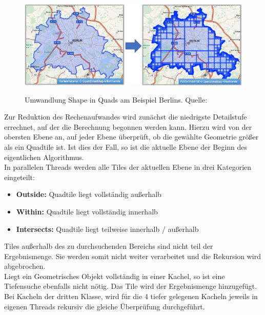 \documentclass[10pt,conference,compsocconf]{IEEEtran}
\begin{document}
\begin{figure}[H]
	\centering
	\includegraphics[width=1\columnwidth]{img/shape2quads.png} \\
	\caption[]{Umwandlung Shape in Quads am Beispiel Berlins. Quelle: \cite{JanBusch}}
	\label{img:shape2quads}
\end{figure}

Zur Reduktion des Rechenaufwandes wird zunächst die niedrigste Detailstufe errechnet, auf der die Berechnung begonnen werden kann. Hierzu wird von der obersten Ebene an, auf jeder Ebene überprüft, ob die gewählte Geometrie größer als ein Quadtile ist. Ist dies der Fall, so ist die aktuelle Ebene der Beginn des eigentlichen Algorithmus.\\
In parallelen Threads werden alle Tiles der aktuellen Ebene in drei Kategorien eingeteilt:
\begin{itemize}
	\item \textbf{Outside:} Quadtile liegt vollständig außerhalb
	\item \textbf{Within:} Quadtile liegt vollständig innerhalb
	\item \textbf{Intersects:} Quadtile liegt teilweise innerhalb / außerhalb
\end{itemize}
Tiles außerhalb des zu durchsuchenden Bereichs sind nicht teil der Ergebnismenge. Sie werden somit nicht weiter verarbeitet und die Rekursion wird abgebrochen.\\
Liegt ein Geometrisches Objekt vollständig in einer Kachel, so ist eine Tiefensuche ebenfalls nicht nötig. Das Tile wird der Ergebnismenge hinzugefügt.\\
Bei Kacheln der dritten Klasse, wird für die 4 tiefer gelegenen Kacheln jeweils in eigenen Threads rekursiv die gleiche Überprüfung durchgeführt.\\
\end{document}
